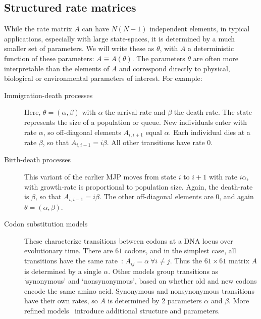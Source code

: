 \subsection{Structured rate matrices}
While the rate matrix $A$ can have $N(N-1)$ independent elements, in typical applications, especially with large state-spaces, it is determined by a much smaller set of parameters. 
We will write these as $\theta$, with $A$ a deterministic function of these parameters: $A \equiv A(\theta)$. 
The parameters $\theta$ are often more interpretable than the elements of $A$ and correspond directly to physical, biological or environmental parameters of interest. 
For example:
\begin{description}
  \item[Immigration-death processes] 
    Here, $\theta = (\alpha,\beta)$ with $\alpha$ the arrival-rate and $\beta$ the death-rate. 
    The state represents the size of a population or queue. 
    New individuals enter with rate $\alpha$, so off-diagonal elements $A_{i,i+1}$ equal $\alpha$.
    Each individual dies at a rate $\beta$, so that $A_{i,i-1}=i\beta$.
    All other transitions have rate $0$. 
  \item[Birth-death processes] 
    This variant of the earlier MJP moves from state $i$ to $i+1$ with rate $i\alpha$, with growth-rate is proportional to population size. 
    Again, the death-rate is $\beta$, so that $A_{i,i-1}=i\beta$.
    The other off-diagonal elements are $0$, and again $\theta=(\alpha,\beta)$.
  \item[Codon substitution models] 
    These characterize transitions between codons at a DNA locus over evolutionary time. 
    There are $61$ codons, and in the simplest case, all transitions have the same rate~\citep{jukescantor69}: $A_{ij} = \alpha\ \forall i \neq j$. 
    Thus the $61\times 61$ matrix $A$ is determined by a single $\alpha$. 
    Other models group transitions as `synonymous' and `nonsynonymous', based on whether old and new codons encode the same amino acid. 
    Synonymous and nonsynonymous transitions have their own rates, so $A$ is determined by 2 parameters $\alpha$ and $\beta$. 
    More refined models~\citep{goldman1994codon} introduce additional structure and parameters. 
\end{description}
